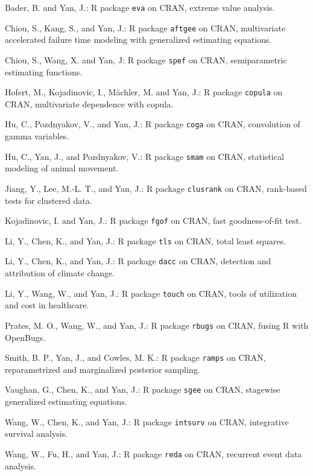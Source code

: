 \documentclass[Statistics]{vita}
\begin{document}
\begin{vita}
\begin{Publications}
\begin{UnderReview}
  \end{UnderReview}
  \begin{Software}
  \item *Bader, B. and Yan, J.: R package \texttt{eva} on CRAN, extreme value analysis.
  \item *Chiou, S., Kang, S., and Yan, J.: R package \texttt{aftgee} on CRAN, multivariate accelerated failure time modeling with generalized estimating equations.
  \item *Chiou, S., Wang, X. and Yan, J: R package \texttt{spef} on CRAN, semiparametric estimating functions.
  \item Hofert, M., Kojadinovic, I.,  M\"achler, M. and Yan, J.: R package \texttt{copula} on CRAN, multivariate dependence with copula.
  \item *Hu, C., Pozdnyakov, V., and Yan, J.: R package \texttt{coga} on CRAN, convolution of gamma variables.
  \item *Hu, C., Yan, J., and Pozdnyakov, V.: R package \texttt{smam} on CRAN, statistical modeling of animal movement. 
  \item *Jiang, Y., Lee, M.-L. T., and Yan, J.: R package \texttt{clusrank} on CRAN, rank-based tests for clustered data.
  \item Kojadinovic, I. and Yan, J.: R package \texttt{fgof} on CRAN, fast goodness-of-fit test.
  \item *Li, Y., Chen, K., and Yan, J.: R package \texttt{tls} on CRAN, total least squares.
  \item *Li, Y., Chen, K., and Yan, J.: R package \texttt{dacc} on CRAN, detection and attribution of climate change.
  \item *Li, Y., Wang, W., and Yan, J.: R package \texttt{touch} on CRAN, tools of utilization and cost in healthcare.
  \item *Prates, M. O., Wang, W., and Yan, J.: R package \texttt{rbugs} on CRAN, fusing R with OpenBugs.
  \item Smith, B. P., Yan, J., and Cowles, M. K.: R package \texttt{ramps} on CRAN, reparametrized and marginalized posterior sampling.
  \item *Vaughan, G., Chen, K., and Yan, J.: R package \texttt{sgee} on CRAN, stagewise generalized estimating equations.
  \item *Wang, W., Chen, K., and Yan, J.: R package \texttt{intsurv} on CRAN, integrative survival analysis.
  \item *Wang, W., Fu, H., and Yan, J.: R package \texttt{reda} on CRAN, recurrent event data analysis.

\end{Software}
\end{Publications}
\end{vita}
\end{document}

